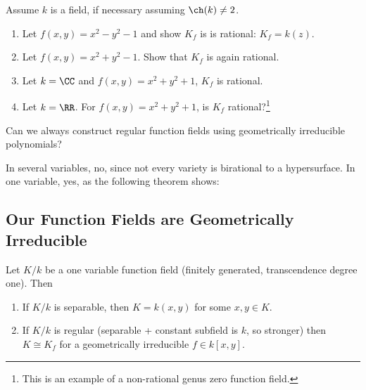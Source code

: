\begin{exercise}

Assume \(k\) is a field, if necessary assuming \(\ch(k) \neq 2\).

\begin{enumerate}
\def\labelenumi{\alph{enumi}.}
\item
  Let \(f(x, y) = x^2 - y^2 -1\) and show \(K_f\) is is rational:
  \(K_f = k(z)\).
\item
  Let \(f(x, y) = x^2 + y^2 - 1\). Show that \(K_f\) is again rational.
\item
  Let \(k = \CC\) and \(f(x, y) = x^2 + y^2 + 1\), \(K_f\) is rational.
\item
  Let \(k= \RR\). For \(f(x ,y) = x^2 + y^2 + 1\), is \(K_f\)
  rational?\footnote{This is an example of a non-rational genus zero
    function field.}
\end{enumerate}

\end{exercise}

\begin{question}

Can we always construct regular function fields using geometrically
irreducible polynomials?

\end{question}

\begin{answer}

In several variables, no, since not every variety is birational to a
hypersurface. In one variable, yes, as the following theorem shows:

\end{answer}

\hypertarget{our-function-fields-are-geometrically-irreducible}{%
\subsection{Our Function Fields are Geometrically
Irreducible}\label{our-function-fields-are-geometrically-irreducible}}

\begin{theorem}

Let \(K/k\) be a one variable function field (finitely generated,
transcendence degree one). Then

\begin{enumerate}
\def\labelenumi{\alph{enumi}.}
\item
  If \(K/k\) is separable, then \(K = k(x, y)\) for some \(x, y\in K\).
\item
  If \(K/k\) is regular (separable + constant subfield is \(k\), so
  stronger) then \(K \cong K_f\) for a geometrically irreducible
  \(f\in k[x ,y]\).
\end{enumerate}

\end{theorem}

